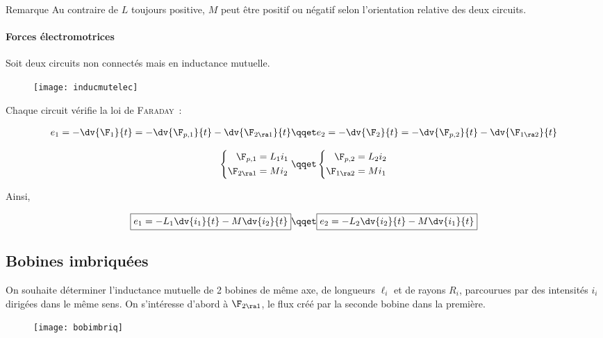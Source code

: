 \documentclass[../main/main.tex]{subfiles}
\begin{document}
\begin{rrema}{Remarque}
	Au contraire de $L$ toujours positive, $M$ peut être positif ou négatif selon
	l'orientation relative des deux circuits.
\end{rrema}

\paragraph*{Forces électromotrices}
Soit deux circuits non connectés mais en inductance mutuelle.
\begin{figure}[h]
	\centering
	\texttt{[image: inducmutelec]}
	\label{fig:inducmutelec}
\end{figure}
\smallbreak
\noindent
Chaque circuit vérifie la loi de \textsc{Faraday}~:
\begin{hide}
	\begin{gather*}
		e_1 = - \dv{\F_1}{t} = -\dv{\F_{p,1}}{t} - \dv{\F_{2\ra 1}}{t}
		\qqet
		e_2 = - \dv{\F_2}{t} = -\dv{\F_{p,2}}{t} - \dv{\F_{1\ra 2}}{t}
	\end{gather*}
\end{hide}
\noindent
\begin{hide}
	\begin{gather*}
		\left\{
		\begin{aligned}{}
			\F_{p,1}    & = L_1i_1
			\\
			\F_{2\ra 1} & = Mi_2
		\end{aligned}
		\right.
		\qqet
		\left\{
		\begin{aligned}{}
			\F_{p,2}    & = L_2i_2
			\\
			\F_{1\ra 2} & = Mi_1
		\end{aligned}
		\right.
	\end{gather*}
\end{hide}
\noindent
Ainsi,
\begin{hide}
	\[
		\boxed{e_1 = -L_1 \dv{i_1}{t} - M \dv{i_2}{t}}
		\qqet
		\boxed{e_2 = -L_2 \dv{i_2}{t} - M \dv{i_1}{t}}
	\]
\end{hide}

\subsection{Bobines imbriquées}
\label{ssec:inducmutimbriq}
On souhaite déterminer l'inductance mutuelle de 2 bobines de même axe, de
longueurs $\ell_{i}$ et de rayons $R_{i}$, parcourues par des intensités $i_{i}$
dirigées dans le même sens. On s'intéresse d'abord à $\F_{2\ra 1}$, le flux créé
par la seconde bobine dans la première.
\begin{figure}[h]
	\centering
	\texttt{[image: bobimbriq]}
	\label{fig:bobimbriq}
\end{figure}
\end{document}
